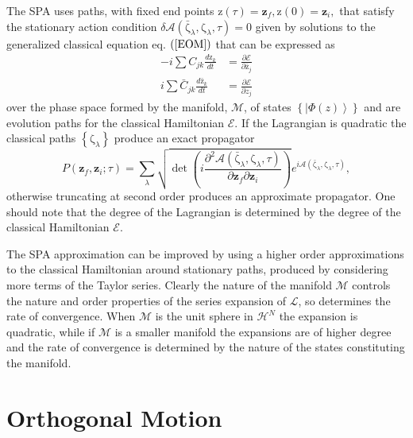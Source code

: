 \documentclass[aps,preprint]{revtex4}%
\begin{document}
The SPA uses paths, with fixed end points $\mathrm{z}\left(  \tau\right)
=\mathbf{z}_{f},\mathrm{z}\left(  0\right)  =\mathbf{z}_{i},$ that satisfy the
stationary action condition $\delta\mathcal{A}\left(  \mathrm{\bar{\zeta}%
}_{\lambda}\mathbf{,}\mathrm{\zeta}_{\lambda}\mathbf{,}\tau\right)  =0$ given
by solutions to the generalized classical equation eq. $\left(  \ref{EOM}%
\right)  $ that can be expressed as
\begin{align}
-i\sum C_{jk}\frac{d\mathrm{z}_{k}}{dt}  &  =\frac{\partial\mathcal{E}%
}{\partial\mathrm{\bar{z}}_{j}}\\
i\sum\bar{C}_{jk}\frac{d\mathrm{\bar{z}}_{k}}{dt}  &  =\frac{\partial
\mathcal{E}}{\partial z_{j}}%
\end{align}
over the phase space formed by the manifold, $\mathcal{M}$, of states
$\left\{  \left\vert \Phi\left(  z\right)  \right\rangle \right\}  $ and are
evolution paths for the classical Hamiltonian $\mathcal{E}.$ If the Lagrangian
is quadratic the classical paths $\left\{  \mathrm{\zeta}_{\lambda}\right\}  $
produce an exact propagator
\begin{equation}
P\left(  \mathbf{z}_{f},\mathbf{z}_{i};\tau\right)  =\sum_{\lambda}\sqrt
{\det\left(  i\frac{\partial^{2}\mathcal{A}\left(  \mathrm{\bar{\zeta}%
}_{\lambda}\mathbf{,}\mathrm{\zeta}_{\lambda}\mathbf{,}\tau\right)  }%
{\partial\mathbf{z}_{f}\partial\mathbf{z}_{i}}\right)  }e^{i\mathcal{A}\left(
\mathrm{\bar{\zeta}}_{\lambda}\mathbf{,}\mathrm{\zeta}_{\lambda}\mathbf{,}%
\tau\right)  },
\end{equation}
otherwise truncating at second order produces an approximate propagator. One
should note that the degree of the Lagrangian is determined by the degree of
the classical Hamiltonian $\mathcal{E}.$

The SPA approximation can be improved by using a higher order approximations
to the classical Hamiltonian around stationary paths, produced by considering
more terms of the Taylor series. Clearly the nature of the manifold
$\mathcal{M}$ controls the nature and order properties of the series expansion
of $\mathcal{L}$, so determines the rate of convergence. When $\mathcal{M}$ is
the unit sphere in $\mathcal{H}^{N}$ the expansion is quadratic, while if
$\mathcal{M}$ is a smaller manifold the expansions are of higher degree and
the rate of convergence is determined by the nature of the states constituting
the manifold.

\section{Orthogonal Motion\label{orthogmotion}}
\end{document}
